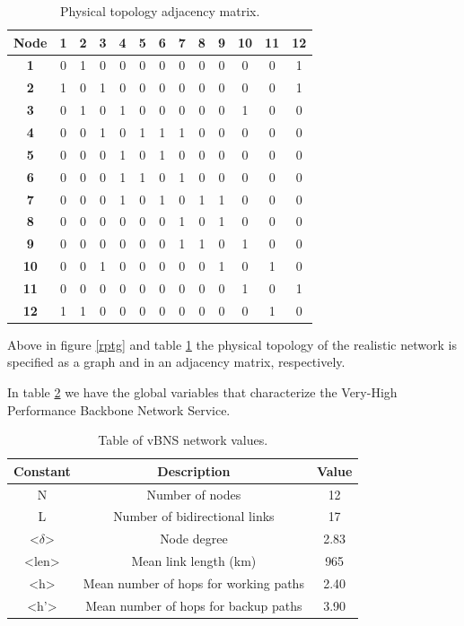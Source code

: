 \begin{table}[H]
\centering
\begin{tabular}{|c|c|c|c|c|c|c|c|c|c|c|c|c|}
\hline
\textbf{Node} & \textbf{1} & \textbf{2} & \textbf{3} & \textbf{4} & \textbf{5} & \textbf{6} & \textbf{7} & \textbf{8} & \textbf{9} & \textbf{10} & \textbf{11} & \textbf{12} \\ \hline
\textbf{1} & 0 & 1 & 0 & 0 & 0 & 0 & 0 & 0 & 0 & 0 & 0 & 1 \\ \hline
\textbf{2} & 1 & 0 & 1 & 0 & 0 & 0 & 0 & 0 & 0 & 0 & 0 & 1 \\ \hline
\textbf{3} & 0 & 1 & 0 & 1 & 0 & 0 & 0 & 0 & 0 & 1 & 0 & 0 \\ \hline
\textbf{4} & 0 & 0 & 1 & 0 & 1 & 1 & 1 & 0 & 0 & 0 & 0 & 0 \\ \hline
\textbf{5} & 0 & 0 & 0 & 1 & 0 & 1 & 0 & 0 & 0 & 0 & 0 & 0 \\ \hline
\textbf{6} & 0 & 0 & 0 & 1 & 1 & 0 & 1 & 0 & 0 & 0 & 0 & 0 \\ \hline
\textbf{7} & 0 & 0 & 0 & 1 & 0 & 1 & 0 & 1 & 1 & 0 & 0 & 0 \\ \hline
\textbf{8} & 0 & 0 & 0 & 0 & 0 & 0 & 1 & 0 & 1 & 0 & 0 & 0 \\ \hline
\textbf{9} & 0 & 0 & 0 & 0 & 0 & 0 & 1 & 1 & 0 & 1 & 0 & 0 \\ \hline
\textbf{10} & 0 & 0 & 1 & 0 & 0 & 0 & 0 & 0 & 1 & 0 & 1 & 0 \\ \hline
\textbf{11} & 0 & 0 & 0 & 0 & 0 & 0 & 0 & 0 & 0 & 1 & 0 & 1 \\ \hline
\textbf{12} & 1 & 1 & 0 & 0 & 0 & 0 & 0 & 0 & 0 & 0 & 1 & 0 \\ \hline
\end{tabular}
\caption{Physical topology adjacency matrix.}
\label{rptam}
\end{table}

Above in figure \ref{rptg} and table \ref{rptam} the physical topology of the realistic network is specified as a graph and in an adjacency matrix, respectively. 

In table \ref{table_ref_net} we have the global variables that characterize the Very-High Performance Backbone Network Service.

\begin{table}[H]
\centering
\begin{tabular}{| c | c | c|}
 \hline
 Constant & Description & Value \\
 \hline\hline
 N & Number of nodes & 12 \\
 L & Number of bidirectional links & 17 \\
 <$\delta$> & Node degree & 2.83 \\
 <len> & Mean link length (km) & 965 \\
 <h> & Mean number of hops for working paths & 2.40 \\
 <h'> & Mean number of hops for backup paths & 3.90 \\
 \hline
\end{tabular}
\caption{Table of vBNS network values.}
\label{table_ref_net}
\end{table}


